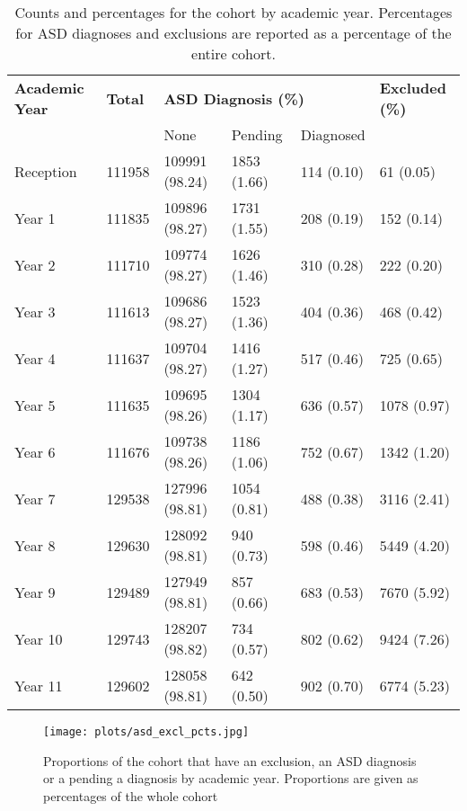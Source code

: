 \documentclass[
]{article}
\begin{document}
\begin{table}[H]
\centering
\renewcommand*{\arraystretch}{1.2}
\begin{scriptsize}\begin{tabular}{llllll}
\\
\toprule
\textbf{Academic Year} & \textbf{Total} & \multicolumn{3}{l}{\textbf{ASD Diagnosis (\%)}} & \textbf{Excluded (\%)} \\
 & & None & Pending & Diagnosed & \\
\midrule
Reception & 111958 & 109991 (98.24) & 1853 (1.66) & 114 (0.10) & 61 (0.05) \\
Year 1 & 111835 & 109896 (98.27) & 1731 (1.55) & 208 (0.19) & 152 (0.14) \\
Year 2 & 111710 & 109774 (98.27) & 1626 (1.46) & 310 (0.28) & 222 (0.20) \\
Year 3 & 111613 & 109686 (98.27) & 1523 (1.36) & 404 (0.36) & 468 (0.42) \\
Year 4 & 111637 & 109704 (98.27) & 1416 (1.27) & 517 (0.46) & 725 (0.65) \\
Year 5 & 111635 & 109695 (98.26) & 1304 (1.17) & 636 (0.57) & 1078 (0.97) \\
Year 6 & 111676 & 109738 (98.26) & 1186 (1.06) & 752 (0.67) & 1342 (1.20) \\
Year 7 & 129538 & 127996 (98.81) & 1054 (0.81) & 488 (0.38) & 3116 (2.41) \\
Year 8 & 129630 & 128092 (98.81) & 940 (0.73) & 598 (0.46) & 5449 (4.20) \\
Year 9 & 129489 & 127949 (98.81) & 857 (0.66) & 683 (0.53) & 7670 (5.92) \\
Year 10 & 129743 & 128207 (98.82) & 734 (0.57) & 802 (0.62) & 9424 (7.26) \\
Year 11 & 129602 & 128058 (98.81) & 642 (0.50) & 902 (0.70) & 6774 (5.23) \\
\bottomrule
\end{tabular}\end{scriptsize}
\caption{Counts and percentages for the cohort by academic year. Percentages for ASD diagnoses and exclusions are reported as a percentage of the entire cohort.}
\label{fig:table_1}
\end{table}

\begin{figure}[H]
\centering
\texttt{[image: plots/asd\_excl\_pcts.jpg]}
\caption{Proportions of the cohort that have an exclusion, an ASD diagnosis or a pending a diagnosis by academic year. Proportions are given as percentages of the whole cohort}
\label{fig:excl_pcts}
\end{figure}
\end{document}
